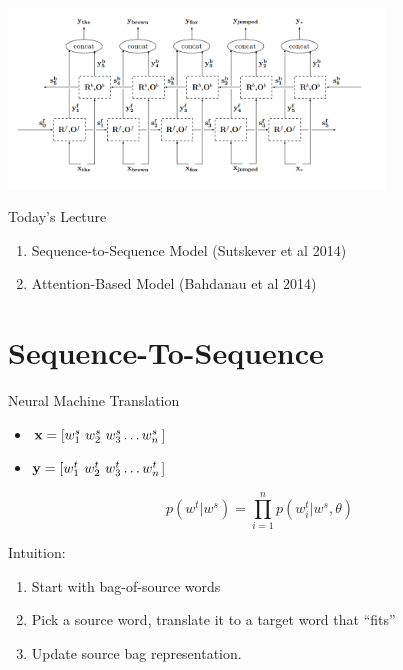 \documentclass{beamer}
\begin{document}
\begin{frame}
  \begin{center}
    \includegraphics[width=10cm]{ygbidirection}
  \end{center}
\end{frame}


\begin{frame}{Today's Lecture}
  \begin{enumerate}
  \item Sequence-to-Sequence Model (Sutskever et al 2014)
    \air
  \item Attention-Based Model (Bahdanau et al 2014)
  \end{enumerate}
\end{frame}

\section{Sequence-To-Sequence}



\begin{frame}{Neural Machine Translation}
  \begin{itemize}
  \item $\mathbf{x}  = [ w^s_1\ w^s_2\ w^s_3\ldots w^s_n $] 
  \item $\mathbf{y} =  [w^t_1\ w^t_2\ w^t_3\ldots w^t_n $] 
  \end{itemize}

 
  \[ p(w^t | w^s) = \prod_{i=1}^n p(w^t_i | w^s, \theta)  \] 

  Intuition:

  \begin{enumerate}
  \item Start with bag-of-source words
  \item Pick a source word, translate it to a target word that ``fits''
  \item Update source bag representation.
  \end{enumerate}
\end{frame}
\end{document}

